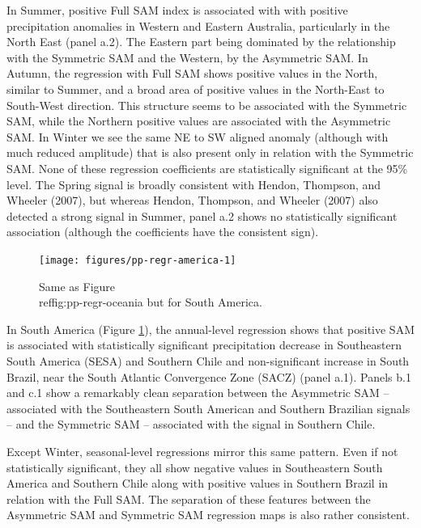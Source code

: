 \documentclass[smallextended]{svjour3}       %
\begin{document}
In Summer, positive Full SAM index is associated with with positive precipitation anomalies in Western and Eastern Australia, particularly in the North East (panel a.2). The Eastern part being dominated by the relationship with the Symmetric SAM and the Western, by the Asymmetric SAM. In Autumn, the regression with Full SAM shows positive values in the North, similar to Summer, and a broad area of positive values in the North-East to South-West direction. This structure seems to be associated with the Symmetric SAM, while the Northern positive values are associated with the Asymmetric SAM. In Winter we see the same NE to SW aligned anomaly (although with much reduced amplitude) that is also present only in relation with the Symmetric SAM. None of these regression coefficients are statistically significant at the 95\% level. The Spring signal is broadly consistent with Hendon, Thompson, and Wheeler (2007), but whereas Hendon, Thompson, and Wheeler (2007) also detected a strong signal in Summer, panel a.2 shows no statistically significant association (although the coefficients have the consistent sign).

\begin{figure}
\texttt{[image: figures/pp-regr-america-1]} \caption{Same as Figure \\ref{fig:pp-regr-oceania} but for South America.}\label{fig:pp-regr-america}
\end{figure}

In South America (Figure \ref{fig:pp-regr-america}), the annual-level regression shows that positive SAM is associated with statistically significant precipitation decrease in Southeastern South America (SESA) and Southern Chile and non-significant increase in South Brazil, near the South Atlantic Convergence Zone (SACZ) (panel a.1). Panels b.1 and c.1 show a remarkably clean separation between the Asymmetric SAM -- associated with the Southeastern South American and Southern Brazilian signals -- and the Symmetric SAM -- associated with the signal in Southern Chile.

Except Winter, seasonal-level regressions mirror this same pattern. Even if not statistically significant, they all show negative values in Southeastern South America and Southern Chile along with positive values in Southern Brazil in relation with the Full SAM. The separation of these features between the Asymmetric SAM and Symmetric SAM regression maps is also rather consistent.
\end{document}
